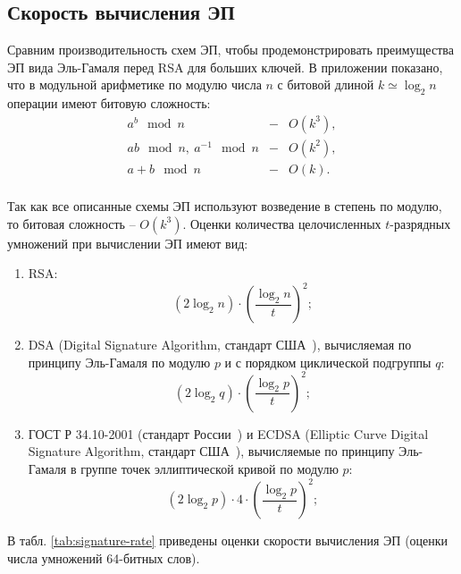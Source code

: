 \subsection*{Скорость вычисления ЭП}

Сравним производительность схем ЭП, чтобы продемонстрировать преимущества ЭП вида Эль-Гамаля перед RSA для больших ключей. В приложении показано, что в модульной арифметике по модулю числа $n$ с битовой длиной $k \simeq \log_2 n$ операции имеют битовую сложность:
\[ \begin{array}{lcl}
    a^b \mod n & - & O(k^3), \\
    ab \mod n, ~ a^{-1} \mod n & - & O(k^2), \\
    a+b \mod n & - & O(k). \\
\end{array} \]

Так как все описанные схемы ЭП используют возведение в степень по модулю, то битовая сложность -- $O(k^3)$. Оценки количества целочисленных $t$-разрядных умножений при вычислении ЭП имеют вид:
\begin{enumerate}
    \item RSA:
        \[ (2 \log_2 n) \cdot \left( \frac{\log_2 n}{t} \right)^2; \]
    \item DSA (Digital Signature Algorithm, стандарт США~\cite{FIPS-PUB-186-4}), вычисляемая по принципу Эль-Гамаля по модулю $p$ и с порядком циклической подгруппы $q$:
        \[ (2 \log_2 q) \cdot \left( \frac{\log_2 p}{t} \right)^2; \]
    \item ГОСТ Р 34.10-2001 (стандарт России~\cite{GOST-2001}) и ECDSA (Elliptic Curve Digital Signature Algorithm, стандарт США~\cite{FIPS-PUB-186-4}), вычисляемые по принципу Эль-Гамаля в группе точек эллиптической кривой по модулю $p$:
        \[ (2 \log_2 p) \cdot 4 \cdot \left( \frac{\log_2 p}{t} \right)^2; \]
\end{enumerate}

В табл. \ref{tab:signature-rate} приведены оценки скорости вычисления ЭП (оценки числа умножений 64-битных слов).

